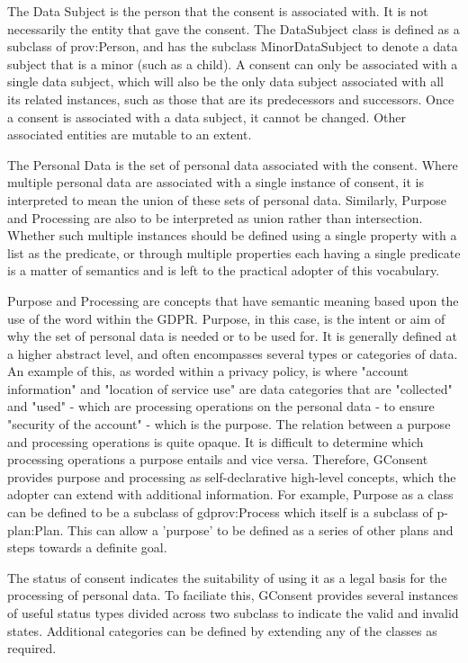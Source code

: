 The Data Subject is the person that the consent is associated with. It is not necessarily the entity that gave the consent. The DataSubject class is defined as a subclass of prov:Person, and has the subclass MinorDataSubject to denote a data subject that is a minor (such as a child). A consent can only be associated with a single data subject, which will also be the only data subject associated with all its related instances, such as those that are its predecessors and successors. Once a consent is associated with a data subject, it cannot be changed. Other associated entities are mutable to an extent.

The Personal Data is the set of personal data associated with the consent. Where multiple personal data are associated with a single instance of consent, it is interpreted to mean the union of these sets of personal data. Similarly, Purpose and Processing are also to be interpreted as union rather than intersection. Whether such multiple instances should be defined using a single property with a list as the predicate, or through multiple properties each having a single predicate is a matter of semantics and is left to the practical adopter of this vocabulary.

Purpose and Processing are concepts that have semantic meaning based upon the use of the word within the GDPR. Purpose, in this case, is the intent or aim of why the set of personal data is needed or to be used for. It is generally defined at a higher abstract level, and often encompasses several types or categories of data. An example of this, as worded within a privacy policy, is where "account information" and "location of service use" are data categories that are "collected" and "used" - which are processing operations on the personal data - to ensure "security of the account" - which is the purpose. The relation between a purpose and processing operations is quite opaque. It is difficult to determine which processing operations a purpose entails and vice versa. Therefore, GConsent provides purpose and processing as self-declarative high-level concepts, which the adopter can extend with additional information. For example, Purpose as a class can be defined to be a subclass of gdprov:Process which itself is a subclass of p-plan:Plan. This can allow a 'purpose' to be defined as a series of other plans and steps towards a definite goal.

The status of consent indicates the suitability of using it as a legal basis for the processing of personal data. To faciliate this, GConsent provides several instances of useful status types divided across two subclass to indicate the valid and invalid states. Additional categories can be defined by extending any of the classes as required.

